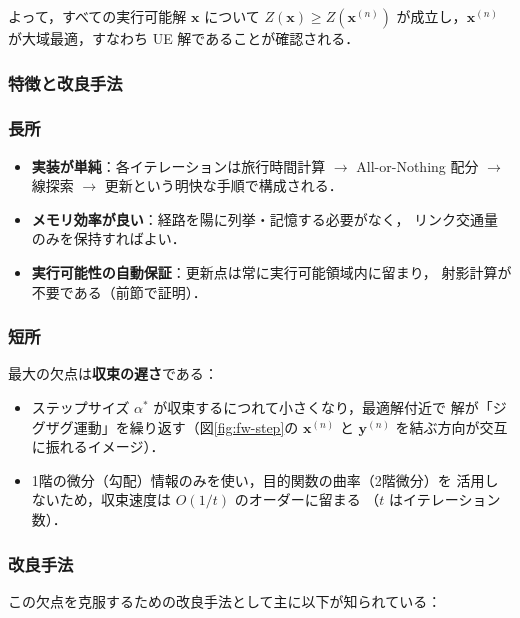 よって，すべての実行可能解 $\boldsymbol{x}$ について $Z(\boldsymbol{x}) \geq Z(\boldsymbol{x}^{(n)})$
が成立し，$\boldsymbol{x}^{(n)}$ が大域最適，すなわち UE 解であることが確認される．

\subsubsection{特徴と改良手法}
\label{subsubsec:fw-features}

\subsubsection*{長所}

\begin{itemize}
  \item \textbf{実装が単純}：各イテレーションは旅行時間計算 $\rightarrow$ All-or-Nothing
        配分 $\rightarrow$ 線探索 $\rightarrow$ 更新という明快な手順で構成される．
  \item \textbf{メモリ効率が良い}：経路を陽に列挙・記憶する必要がなく，
        リンク交通量のみを保持すればよい．
  \item \textbf{実行可能性の自動保証}：更新点は常に実行可能領域内に留まり，
        射影計算が不要である（前節で証明）．
\end{itemize}

\subsubsection*{短所}

最大の欠点は\textbf{収束の遅さ}である\cite{Pokutta2024}：

\begin{itemize}
  \item ステップサイズ $\alpha^*$ が収束するにつれて小さくなり，最適解付近で
        解が「ジグザグ運動」を繰り返す（図\ref{fig:fw-step}の $\boldsymbol{x}^{(n)}$ と
        $\boldsymbol{y}^{(n)}$ を結ぶ方向が交互に振れるイメージ）．
  \item 1階の微分（勾配）情報のみを使い，目的関数の曲率（2階微分）を
        活用しないため，収束速度は $O(1/t)$ のオーダーに留まる
        （$t$ はイテレーション数）．
\end{itemize}

\subsubsection*{改良手法}

この欠点を克服するための改良手法として主に以下が知られている\cite{土木学会1998,Sheffi1985}：

